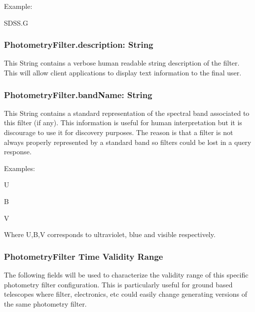 \documentclass[11pt,a4paper]{ivoa}
\begin{document}
Example:
\par

SDSS.G
\bigskip




\subsubsection{PhotometryFilter.description: String}
This String contains a verbose human readable string description of the 
filter. This will allow client applications to display text information 
to the final user.
\par

\subsubsection{PhotometryFilter.bandName: String}
This String contains a standard representation of the spectral band 
associated to this filter (if any). This information is useful for human 
interpretation but it is discourage to use it for discovery purposes. The 
reason is that a filter is not always properly represented by a standard 
band so filters could be lost in a query response.
\par

Examples:
\par


U \par B  \par V
\bigskip


Where U,B,V corresponds to ultraviolet, blue and visible respectively.
\par

\subsubsection{PhotometryFilter Time Validity Range}
The following fields will be used to characterize the validity range of 
this specific photometry filter configuration. This is particularly useful 
for ground based telescopes where filter, electronics, etc could easily 
change generating versions of the same photometry filter.
\par
\end{document}
